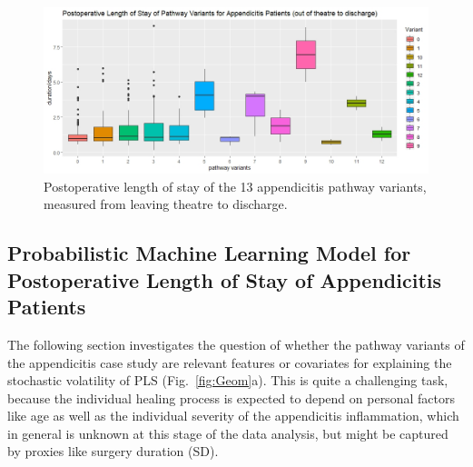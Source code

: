 \begin{figure}[t]
\centering
\includegraphics[width=\textwidth]{images/postoperative_length_of_stay_appendicitis.jpeg}
\caption{Postoperative length of stay of the 13 appendicitis pathway variants, measured from leaving theatre to discharge.}
\label{fig:post op length of stay appendicitis}
\end{figure}

\subsection{Probabilistic Machine Learning Model for Postoperative Length of Stay of Appendicitis Patients}
\label{sec:ML}
The following section investigates the question of whether the pathway
variants of the appendicitis case study are relevant features or
covariates for explaining the stochastic volatility of PLS (Fig.~\ref{fig:Geom}a).
This is quite a challenging task, because the individual healing process is expected to depend on personal factors like age \cite{polanczyk2001impact} as well as the individual severity of the appendicitis inflammation, which in general is unknown at this stage of the data analysis, but might be captured by proxies like surgery duration (SD). 

